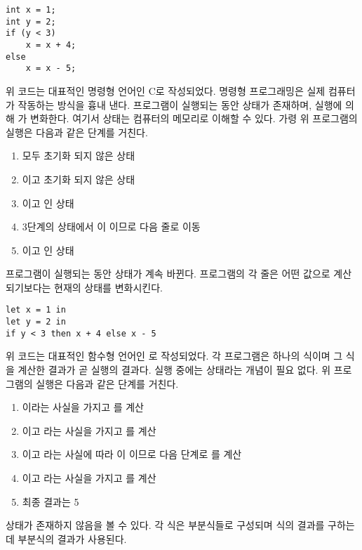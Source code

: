 \begin{verbatim}
int x = 1;
int y = 2;
if (y < 3)
    x = x + 4;
else
    x = x - 5;
\end{verbatim}

위 코드는 대표적인 명령형 언어인 C로 작성되었다. 명령형 프로그래밍은 실제
컴퓨터가 작동하는 방식을 흉내 낸다. 프로그램이 실행되는 동안 상태가 존재하며,
실행에 의해 가 변화한다. 여기서 상태는 컴퓨터의 메모리로 이해할 수
있다. 가령 위 프로그램의 실행은 다음과 같은 단계를 거친다.

\begin{enumerate}
\item {}  모두 초기화 되지 않은 상태
\item {} 이고  초기화 되지 않은 상태
\item {} 이고  인 상태
\item 3단계의 상태에서 이 이므로 다음 줄로 이동
\item {} 이고  인 상태
\end{enumerate}

프로그램이 실행되는 동안 상태가 계속 바뀐다. 프로그램의 각 줄은 어떤 값으로
계산되기보다는 현재의 상태를 변화시킨다.

\begin{verbatim}
let x = 1 in
let y = 2 in
if y < 3 then x + 4 else x - 5
\end{verbatim}

위 코드는 대표적인 함수형 언어인 로 작성되었다. 각 프로그램은
하나의 식이며 그 식을 계산한 결과가 곧 실행의 결과다. 실행 중에는 상태라는
개념이 필요 없다. 위 프로그램의 실행은 다음과 같은 단계를 거친다.

\begin{enumerate}
\item {} 이라는 사실을 가지고 를 계산
\item {} 이고  라는 사실을 가지고 를 계산
\item {} 이고  라는 사실에 따라 이
  이므로 다음 단계로 를 계산
\item {} 이고  라는 사실을 가지고 를 계산
\item 최종 결과는 5
\end{enumerate}

상태가 존재하지 않음을 볼 수 있다. 각 식은 부분식들로 구성되며 식의 결과를
구하는 데 부분식의 결과가 사용된다.

